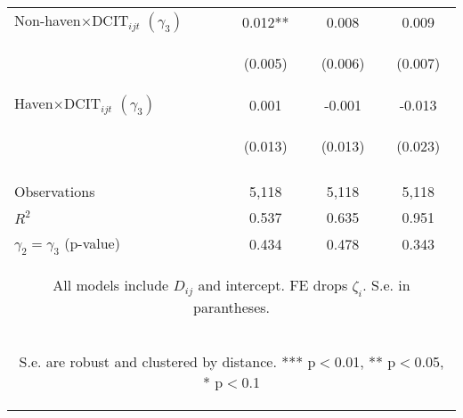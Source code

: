 \begin{center}
\begin{tabular}{lccc}
Non-haven$\times\text{DCIT}_{ijt}$ $(\gamma_3)$ & 0.012** & 0.008 & 0.009 \\
\vspace{4pt} & \begin{footnotesize}(0.005)\end{footnotesize} & \begin{footnotesize}(0.006)\end{footnotesize} & \begin{footnotesize}(0.007)\end{footnotesize} \\
Haven$\times\text{DCIT}_{ijt}$ $(\gamma_3)$ & 0.001 & -0.001 & -0.013 \\
 & \begin{footnotesize}(0.013)\end{footnotesize} & \begin{footnotesize}(0.013)\end{footnotesize} & \begin{footnotesize}(0.023)\end{footnotesize} \\
\vspace{4pt} & \begin{footnotesize}\end{footnotesize} & \begin{footnotesize}\end{footnotesize} & \begin{footnotesize}\end{footnotesize} \\
Observations & 5,118 & 5,118 & 5,118 \\
$R^2$ & 0.537 & 0.635 & 0.951 \\
 $\gamma_2=\gamma_3 $ (p-value) & 0.434 & 0.478 & 0.343 \\ \hline
\multicolumn{4}{c}{\begin{footnotesize} All models include $ D_{ij}$ and intercept. FE drops $\zeta_i$. S.e. in parantheses.\end{footnotesize}} \\
\multicolumn{4}{c}{\begin{footnotesize} S.e. are robust and clustered by distance. *** p$<$0.01, ** p$<$0.05, * p$<$0.1\end{footnotesize}} \\
\end{tabular}
\end{center}
